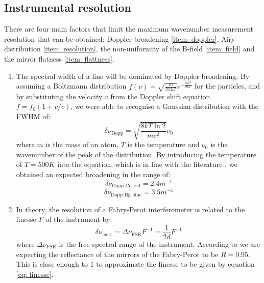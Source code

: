 \documentclass[11pt]{article}
\begin{document}
\subsection{Instrumental resolution}
There are four main factors that limit the maximum wavenumber measurement resolution that can be obtained: Doppler broadening \ref{item: doppler}, Airy distribution \ref{item: resolution}, the non-uniformity of the B-field \ref{item: field} and the mirror flatness \ref{item: flattness}. 
\begin{enumerate}[label=(\alph*), ref=(\alph*)]
  \item \label{item: doppler} The spectral width of a line will be dominated by Doppler broadening. By assuming a Boltzmann distribution $f(v) = \sqrt{\frac{m}{2 \pi k T}} e^{-\frac{mv^2}{2kT}}$ for the particles, and by substituting the velocity $v$ from the Doppler shift equation $f = f_0 (1+v/c)$, we were able to recognise a Gaussian distribution with the FWHM of: 
  \begin{equation}
      \delta \nu_{\mathrm{Dopp}} = \sqrt{\frac{8 k T \ln{2}}{mc^2}} \nu_0
  \end{equation}
  where $m$ is the mass of an atom, $T$ is the temperature and $\nu_0$ is the wavenumber of the peak of the distribution. By introducing the temperature of $T = 500 \si{K}$ into the equation, which is in line with the literature \cite{doi:10.1098/rspa.1936.0108}, we obtained an expected broadening in the range of:
  \begin{equation}
      \delta \nu_{\text{Dopp Cd red}} = 2.4 \si{m^{-1}} \label{eq: nu doppler}
  \end{equation}
  \begin{equation}
      \delta \nu_{\text{Dopp Hg blue}} = 3.5 \si{m^{-1}}
  \end{equation}
  \item \label{item: resolution} In theory, the resolution of a Fabry-Perot interferometer is related to the finesse $F$ of the instrument by: 
  \begin{equation} \label{eq: instr resolution}
      \delta \nu_{\text{instr}} = \Delta \nu_{\text{FSR}} F^{-1} = \frac{1}{2d} F^{-1}
  \end{equation}
  where $\Delta \nu_{\text{FSR}}$ is the free spectral range of the instrument. According to \cite{FabryPerotEtalonGuide} we are expecting the reflectance of the mirrors of the Fabry-Perot to be $R = 0.95$. This is close enough to $1$ to approximate the finesse to be given by equation \eqref{eq: finesse}. 
  \begin{equation}

\end{equation}
\end{enumerate}
\end{document}
